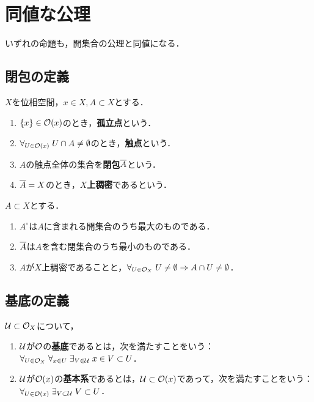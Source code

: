 \documentclass[uplatex,dvipdfmx]{jsreport}
\begin{document}
\section{同値な公理}

\begin{tcolorbox}[colframe=ForestGreen, colback=ForestGreen!10!white,breakable,colbacktitle=ForestGreen!40!white,coltitle=black,fonttitle=\bfseries\sffamily,
    title=]
    いずれの命題も，開集合の公理と同値になる．
\end{tcolorbox}

\subsection{閉包の定義}

\begin{definition}
    $X$を位相空間，$x\in X,A\subset X$とする．
    \begin{enumerate}
        \item $\{x\}\in\mathcal{O}(x)$のとき，\textbf{孤立点}という．
        \item $\forall_{U\in\mathcal{O}(x)}\;U\cap A\ne\emptyset$のとき，\textbf{触点}という．
        \item $A$の触点全体の集合を\textbf{閉包}$\overline{A}$という．
        \item $\overline{A}=X$のとき，\textbf{$X$上稠密}であるという．
    \end{enumerate}
\end{definition}

\begin{proposition}[開核，閉包，稠密性の特徴付け]
    $A\subset X$とする．
    \begin{enumerate}
        \item $A^\circ$は$A$に含まれる開集合のうち最大のものである．
        \item $\overline{A}$は$A$を含む閉集合のうち最小のものである．
        \item $A$が$X$上稠密であることと，$\forall_{U\in\mathcal{O}_X}\;U\ne\emptyset\Rightarrow A\cap U\ne\emptyset$．
    \end{enumerate}
\end{proposition}

\subsection{基底の定義}

\begin{definition}
    $\mathcal{U}\subset\mathcal{O}_X$について，
    \begin{enumerate}
        \item $\mathcal{U}$が$\mathcal{O}$の\textbf{基底}であるとは，次を満たすことをいう：$\forall_{U\in\mathcal{O}_X}\;\forall_{x\in U}\;\exists_{V\in\mathcal{U}}\;x\in V\subset U$．
        \item $\mathcal{U}$が$\mathcal{O}(x)$の\textbf{基本系}であるとは，$\mathcal{U}\subset\mathcal{O}(x)$であって，次を満たすことをいう：$\forall_{U\in\mathcal{O}(x)}\;\exists_{V\subset\mathcal{U}}\;V\subset U$．
    \end{enumerate}
\end{definition}
\end{document}

